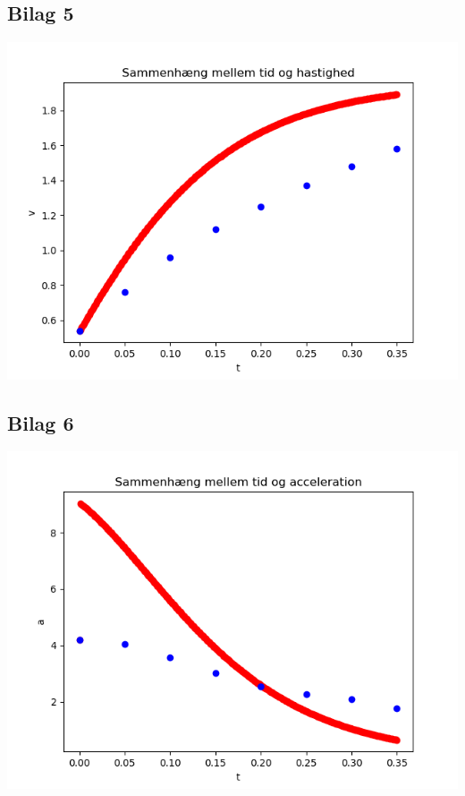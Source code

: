 \documentclass[12pt]{article}
\begin{document}
\subsection*{Bilag 5}
\begin{center}
\includegraphics[width=\linewidth]{hastighed.png}
\end{center}

\subsection*{Bilag 6}
\begin{center}
\includegraphics[width=\linewidth]{acceleration.png}
\end{center}
\end{document}
